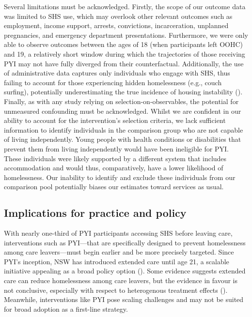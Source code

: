 \documentclass[
  jou,
  floatsintext,
  longtable,
  nolmodern,
  notxfonts,
  notimes,
  colorlinks=true,linkcolor=blue,citecolor=blue,urlcolor=blue]{apa7}
\begin{document}
Several limitations must be acknowledged. Firstly, the scope of our
outcome data was limited to SHS use, which may overlook other relevant
outcomes such as employment, income support, arrests, convictions,
incarceration, unplanned pregnancies, and emergency department
presentations. Furthermore, we were only able to observe outcomes
between the ages of 18 (when participants left OOHC) and 19, a
relatively short window during which the trajectories of those receiving
PYI may not have fully diverged from their counterfactual. Additionally,
the use of administrative data captures only individuals who engage with
SHS, thus failing to account for those experiencing hidden homelessness
(e.g., couch surfing), potentially underestimating the true incidence of
housing instability
(). Finally, as with any study relying on selection-on-observables,
the potential for unmeasured confounding must be acknowledged. Whilst we
are confident in our ability to account for the intervention's selection
criteria, we lack sufficient information to identify individuals in the
comparison group who are not capable of living independently. Young
people with health conditions or disabilities that prevent them from
living independently would have been ineligible for PYI. These
individuals were likely supported by a different system that includes
accommodation and would thus, comparatively, have a lower likelihood of
homelessness. Our inability to identify and exclude these individuals
from our comparison pool potentially biases our estimates toward
services as usual.

\subsection{Implications for practice and
policy}\label{implications-for-practice-and-policy}

With nearly one-third of PYI participants accessing SHS before leaving
care, interventions such as PYI---that are specifically designed to
prevent homelessness among care leavers---must begin earlier and be more
precisely targeted. Since PYI's inception, NSW has introduced extended
care until age 21, a scalable initiative appealing as a broad policy
option (). Some evidence suggests extended care can reduce
homelessness among care leavers, but the evidence in favour is not
conclusive, especially with respect to heterogenous treatment effects
(). Meanwhile, interventions like PYI pose scaling challenges and
may not be suited for broad adoption as a first-line strategy.
\end{document}
